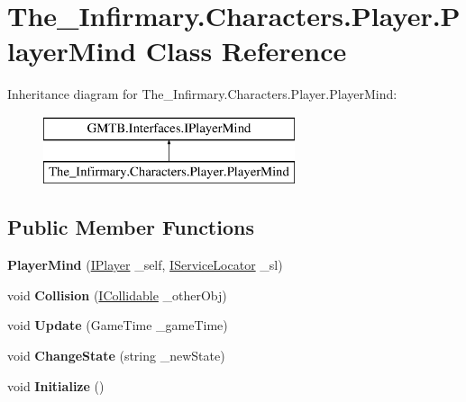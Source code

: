 \hypertarget{class_the___infirmary_1_1_characters_1_1_player_1_1_player_mind}{}\section{The\+\_\+\+Infirmary.\+Characters.\+Player.\+Player\+Mind Class Reference}
\label{class_the___infirmary_1_1_characters_1_1_player_1_1_player_mind}
Inheritance diagram for The\+\_\+\+Infirmary.\+Characters.\+Player.\+Player\+Mind\+:\begin{figure}[H]
\begin{center}
\leavevmode
\includegraphics[height=2.000000cm]{class_the___infirmary_1_1_characters_1_1_player_1_1_player_mind}
\end{center}
\end{figure}
\subsection*{Public Member Functions}
\begin{DoxyCompactItemize}
\item 
\mbox{\label{class_the___infirmary_1_1_characters_1_1_player_1_1_player_mind_a7af3be408b2d86e7075189d1cde7587f}} 
{\bfseries Player\+Mind} (\mbox{\hyperlink{interface_g_m_t_b_1_1_interfaces_1_1_i_player}{I\+Player}} \+\_\+self, \mbox{\hyperlink{interface_g_m_t_b_1_1_interfaces_1_1_i_service_locator}{I\+Service\+Locator}} \+\_\+sl)
\item 
\mbox{\label{class_the___infirmary_1_1_characters_1_1_player_1_1_player_mind_a4271243d06b2bb4be4bd29c6e18a3f12}} 
void {\bfseries Collision} (\mbox{\hyperlink{interface_g_m_t_b_1_1_collision_system_1_1_i_collidable}{I\+Collidable}} \+\_\+other\+Obj)
\item 
\mbox{\label{class_the___infirmary_1_1_characters_1_1_player_1_1_player_mind_a35cd0fe1baa0fd67adfe8c438983092f}} 
void {\bfseries Update} (Game\+Time \+\_\+game\+Time)
\item 
\mbox{\label{class_the___infirmary_1_1_characters_1_1_player_1_1_player_mind_a6d2cba84a51ba1979b3f3e2b8afbbc41}} 
void {\bfseries Change\+State} (string \+\_\+new\+State)
\item 
\mbox{\label{class_the___infirmary_1_1_characters_1_1_player_1_1_player_mind_ad28d2f30589641598240654fe38bc892}} 
void {\bfseries Initialize} ()
\end{DoxyCompactItemize}
